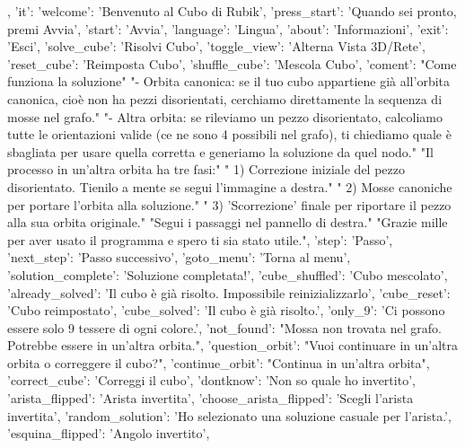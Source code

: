 {{    },
    'it': {
        'welcome':         'Benvenuto al Cubo di Rubik',
        'press_start':     'Quando sei pronto, premi Avvia',
        'start':           'Avvia',
        'language':        'Lingua',
        'about':           'Informazioni',
        'exit':            'Esci',
        'solve_cube':      'Risolvi Cubo',
        'toggle_view':     'Alterna Vista 3D/Rete',
        'reset_cube':      'Reimposta Cubo',
        'shuffle_cube':    'Mescola Cubo',
        'coment':          "Come funziona la soluzione\n\n"
                            "- Orbita canonica: se il tuo cubo appartiene già all'orbita canonica, cioè non ha pezzi disorientati, cerchiamo direttamente la sequenza di mosse nel grafo.\n"
                            "- Altra orbita: se rileviamo un pezzo disorientato, calcoliamo tutte le orientazioni valide (ce ne sono 4 possibili nel grafo), ti chiediamo quale è sbagliata per usare quella corretta e generiamo la soluzione da quel nodo.\n\n"
                            "Il processo in un'altra orbita ha tre fasi:\n"
                            "  1) Correzione iniziale del pezzo disorientato. Tienilo a mente se segui l'immagine a destra.\n"
                            "  2) Mosse canoniche per portare l'orbita alla soluzione.\n"
                            "  3) 'Scorrezione' finale per riportare il pezzo alla sua orbita originale.\n\n"
                            "Segui i passaggi nel pannello di destra.\n\n"
                            "Grazie mille per aver usato il programma e spero ti sia stato utile.\n\n",
        'step':          'Passo',
        'next_step':       'Passo successivo',
        'goto_menu':       'Torna al menu',
        'solution_complete': 'Soluzione completata!',
        'cube_shuffled':   'Cubo mescolato',
        'already_solved':  'Il cubo è già risolto. Impossibile reinizializzarlo',
        'cube_reset':      'Cubo reimpostato',
        'cube_solved':     'Il cubo è già risolto.',
        'only_9':          'Ci possono essere solo 9 tessere di ogni colore.',
        'not_found':       "Mossa non trovata nel grafo. Potrebbe essere in un'altra orbita.",
        'question_orbit':  "Vuoi continuare in un'altra orbita o correggere il cubo?",
        'continue_orbit':  "Continua in un'altra orbita",
        'correct_cube':    'Correggi il cubo',
        'dontknow':        'Non so quale ho invertito',
        'arista_flipped':  'Arista invertita',
        'choose_arista_flipped': 'Scegli l’arista invertita',
        'random_solution': 'Ho selezionato una soluzione casuale per l’arista.',
        'esquina_flipped': 'Angolo invertito',
}}

